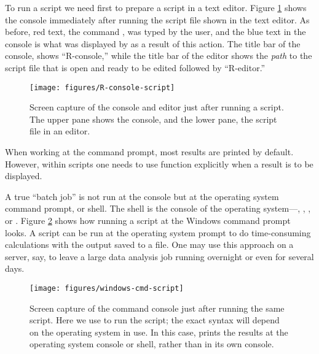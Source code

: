 \documentclass[krantz2]{krantz}\usepackage{knitr}
\begin{document}
To run a script we need first to prepare a script in a text editor. Figure \ref{fig:intro:script} shows the console immediately after running the script file shown in the text editor. As before, red text, the command , was typed by the user, and the blue text in the console is what was displayed by \Rpgrm as a result of this action. The title bar of the console, shows ``R-console,'' while the title bar of the editor shows the \emph{path} to the script file that is open and ready to be edited followed by ``R-editor.''

\begin{figure}
  \centering
  \texttt{[image: figures/R-console-script]}
  \caption[Script sourced at the R console]{Screen capture of the \Rpgrm console and editor just after running a script. The upper pane shows the \Rpgrm console, and the lower pane, the script file in an editor. }\label{fig:intro:script}
\end{figure}

\begin{warningbox}
When working at the command prompt, most results are printed by default. However, within scripts one needs to use function  explicitly when a result is to be displayed.
\end{warningbox}

A true ``batch job'' is not run at the \Rpgrm console but at the operating system command prompt, or shell. The shell is the console of the operating system---, , , or . Figure \ref{fig:intro:shell} shows how running a script at the Windows command prompt looks. A script can be run at the operating system prompt to do time-consuming calculations with the output saved to a file. One may use this approach on a server, say, to leave a large data analysis job running overnight or even for several days.

\begin{figure}
  \centering
  \texttt{[image: figures/windows-cmd-script]}
  \caption[Script at the Windows cmd promt]{Screen capture of the  command console just after running the same script. Here we use  to run the script; the exact syntax will depend on the operating system in use. In this case, \Rpgrm prints the results at the operating system console or shell, rather than in its own \Rpgrm console.}\label{fig:intro:shell}
\end{figure}
\end{document}
